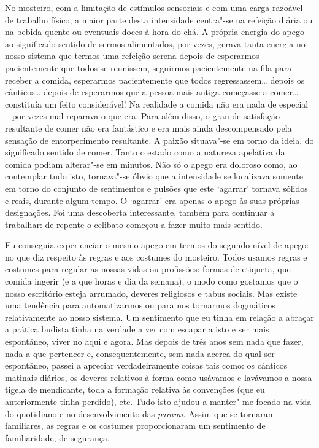 No mosteiro, com a
limitação de estímulos sensoriais e com uma carga razoável de trabalho físico, a
maior parte desta intensidade centra"-se na refeição diária ou na bebida quente
ou eventuais doces à hora do chá. A própria energia do apego ao significado
sentido de sermos alimentados, por vezes, gerava tanta energia no nosso sistema
que termos uma refeição serena depois de esperarmos pacientemente que todos se
reunissem, seguirmos pacientemente na fila para receber a comida, esperarmos
pacientemente que todos regressassem\ldots{} depois os cânticos\ldots{} depois
de esperarmos que a pessoa mais antiga começasse a comer\ldots{} -- constituía
um feito considerável! Na realidade a comida não era nada de especial -- por
vezes mal reparava o que era. Para além disso, o grau de satisfação resultante
de comer não era fantástico e era mais ainda descompensado pela sensação de
entorpecimento resultante. A paixão situava"-se em torno da ideia, do
significado sentido de comer. Tanto o estado como a natureza apelativa da comida
podiam alterar"-se em minutos. Não só o apego era doloroso como, ao contemplar
tudo isto, tornava"-se óbvio que a intensidade se localizava somente em torno do
conjunto de sentimentos e pulsões que este `agarrar' tornava sólidos e reais,
durante algum tempo. O `agarrar' era apenas o apego às suas próprias
designações. Foi uma descoberta interessante, também para continuar a trabalhar:
de repente o celibato começou a fazer muito mais sentido.

Eu conseguia experienciar o mesmo apego em termos do segundo nível de apego: no
que diz respeito às regras e aos costumes do mosteiro. Todos usamos regras e
costumes para regular as nossas vidas ou profissões: formas de etiqueta, que
comida ingerir (e a que horas e dia da semana), o modo como gostamos que o nosso
escritório esteja arrumado, deveres religiosos e tabus sociais. Mas existe uma
tendência para automatizarmos ou para nos tornarmos dogmáticos relativamente ao
nosso sistema. Um sentimento que eu tinha em relação a abraçar a prática budista
tinha na verdade a ver com escapar a isto e ser mais espontâneo, viver no aqui e
agora. Mas depois de três anos sem nada que fazer, nada a que pertencer e,
consequentemente, sem nada acerca do qual ser espontâneo, passei a apreciar
verdadeiramente coisas tais como: os cânticos matinais diários, os deveres
relativos à forma como usávamos e lavávamos a nossa tigela de mendicante, toda a
formação relativa às convenções (que eu anteriormente tinha perdido), etc. Tudo
isto ajudou a manter"-me focado na vida do quotidiano e no desenvolvimento das
\emph{pāramī}. Assim que se tornaram familiares, as regras e os costumes
proporcionaram um sentimento de familiaridade, de segurança.


